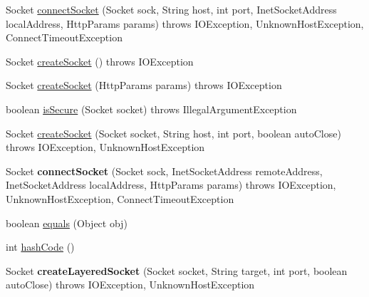 \begin{DoxyCompactItemize}
\item 
Socket \hyperlink{classcom_1_1bluevia_1_1commons_1_1connector_1_1http_1_1SSLForNonValidCertsSocketFactory_a3f86f368bf417026fb5def815b4858ab}{connectSocket} (Socket sock, String host, int port, InetSocketAddress localAddress, HttpParams params)  throws IOException, UnknownHostException,             ConnectTimeoutException 
\item 
Socket \hyperlink{classcom_1_1bluevia_1_1commons_1_1connector_1_1http_1_1SSLForNonValidCertsSocketFactory_a218235f82d3f203be10d08134cdcb2ee}{createSocket} ()  throws IOException 
\item 
Socket \hyperlink{classcom_1_1bluevia_1_1commons_1_1connector_1_1http_1_1SSLForNonValidCertsSocketFactory_a82f7ba213796935a4ec3a29a4df41020}{createSocket} (HttpParams params)  throws IOException 
\item 
boolean \hyperlink{classcom_1_1bluevia_1_1commons_1_1connector_1_1http_1_1SSLForNonValidCertsSocketFactory_ad284691d1f4b7176322787c184140fc8}{isSecure} (Socket socket)  throws IllegalArgumentException 
\item 
Socket \hyperlink{classcom_1_1bluevia_1_1commons_1_1connector_1_1http_1_1SSLForNonValidCertsSocketFactory_a350f10306681da36e5a96d5dd4f5f84c}{createSocket} (Socket socket, String host, int port, boolean autoClose)  throws IOException, UnknownHostException 
\item 
\hypertarget{classcom_1_1bluevia_1_1commons_1_1connector_1_1http_1_1SSLForNonValidCertsSocketFactory_a394c2ba6bab808f5cc5f1d0c4db3172e}{
Socket {\bfseries connectSocket} (Socket sock, InetSocketAddress remoteAddress, InetSocketAddress localAddress, HttpParams params)  throws IOException, UnknownHostException, ConnectTimeoutException }
\label{classcom_1_1bluevia_1_1commons_1_1connector_1_1http_1_1SSLForNonValidCertsSocketFactory_a394c2ba6bab808f5cc5f1d0c4db3172e}

\item 
boolean \hyperlink{classcom_1_1bluevia_1_1commons_1_1connector_1_1http_1_1SSLForNonValidCertsSocketFactory_ae53f6da0866a53888e6129774673b009}{equals} (Object obj)
\item 
int \hyperlink{classcom_1_1bluevia_1_1commons_1_1connector_1_1http_1_1SSLForNonValidCertsSocketFactory_a4cc1c0a929ad5f17ac3e8aea5a58dfe1}{hashCode} ()
\item 
\hypertarget{classcom_1_1bluevia_1_1commons_1_1connector_1_1http_1_1SSLForNonValidCertsSocketFactory_ae8ffc7adb336bccf8a19fafd4245f90d}{
Socket {\bfseries createLayeredSocket} (Socket socket, String target, int port, boolean autoClose)  throws IOException, UnknownHostException }
\label{classcom_1_1bluevia_1_1commons_1_1connector_1_1http_1_1SSLForNonValidCertsSocketFactory_ae8ffc7adb336bccf8a19fafd4245f90d}

\end{DoxyCompactItemize}


